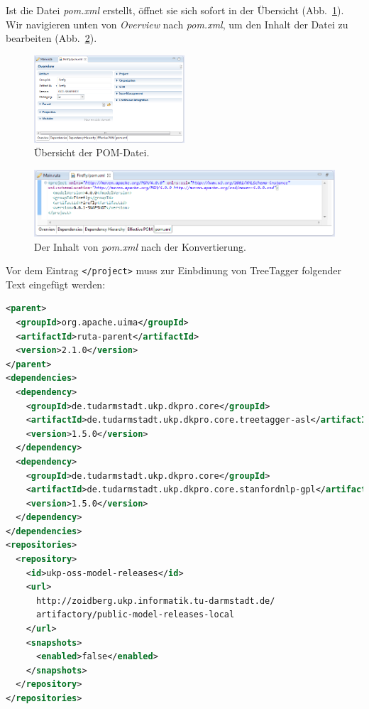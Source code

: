 \documentclass{article}
\begin{document}
Ist die Datei \textit{pom.xml} erstellt, öffnet sie sich sofort in der Übersicht (Abb.~\ref{overview}). Wir navigieren unten von \textit{Overview} nach \textit{pom.xml}, um den Inhalt der Datei zu bearbeiten (Abb.~\ref{pom}).

\begin{figure}
\centering
\includegraphics[width=0.5\textwidth]{figs/tt_overview.png}
\caption{Übersicht der POM-Datei.}
\label{overview}
\end{figure}

\begin{figure}
\centering
\includegraphics[width=1\textwidth]{figs/tt_pom.png}
\caption{Der Inhalt von \textit{pom.xml} nach der Konvertierung.}
\label{pom}
\end{figure}

\newpage

Vor dem Eintrag \texttt{</project>} muss zur Einbdinung von TreeTagger folgender Text eingefügt werden:

\begin{center}
\begin{lstlisting}[language=XML,
frame=L,
stepnumber=0,
basicstyle=\scriptsize\ttfamily,
morekeywords={parent,groupId,artifactId,dependencies,dependency,
repositories,repository,id,url,snapshots, enabled},
keywordstyle=\color{mygreen},
keepspaces=true]
<parent>
  <groupId>org.apache.uima</groupId>
  <artifactId>ruta-parent</artifactId>
  <version>2.1.0</version>
</parent>
<dependencies>
  <dependency>
    <groupId>de.tudarmstadt.ukp.dkpro.core</groupId>
    <artifactId>de.tudarmstadt.ukp.dkpro.core.treetagger-asl</artifactId>
    <version>1.5.0</version>
  </dependency>
  <dependency>
    <groupId>de.tudarmstadt.ukp.dkpro.core</groupId>
    <artifactId>de.tudarmstadt.ukp.dkpro.core.stanfordnlp-gpl</artifactId>
    <version>1.5.0</version>
  </dependency>
</dependencies>
<repositories>
  <repository>
    <id>ukp-oss-model-releases</id>
    <url>
      http://zoidberg.ukp.informatik.tu-darmstadt.de/
      artifactory/public-model-releases-local
    </url>
    <snapshots>
      <enabled>false</enabled>
    </snapshots>
  </repository>
</repositories>
\end{lstlisting}
\end{center}
\end{document}
